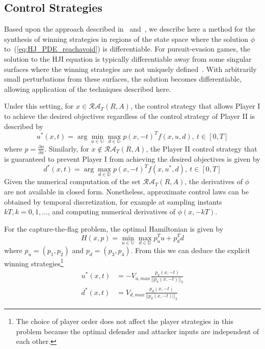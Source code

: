 \documentclass[letterpaper, 10 pt, conference]{ieeeconf}  %
\numberwithin{algorithm}{section}
\begin{document}
\subsection{Control Strategies}
\label{sub:ctrl_inputs}
Based upon the approach described in~\cite{j:Lygeros-automatica-1999} and~\cite{j:Tomlin-ProcIEEE-2000}, we describe here a method for the synthesis of winning strategies in regions of the state space where the solution $\phi$ to~(\ref{eq:HJ_PDE_reachavoid}) is differentiable.  For pursuit-evasion games, the solution to the HJI equation is typically differentiable away from some singular surfaces where the winning strategies are not uniquely defined~\cite{b:basar-olsder-1999}.  With arbitrarily small perturbations from these surfaces, the solution becomes differentiable, allowing application of the techniques described here.  

Under this setting, for $x \in \mathcal{RA}_T(R,A)$, the control strategy that allows Player I to achieve the desired objectives regardless of the control strategy of Player II is described by
\begin{equation}
	\label{eq:opt_ctrl_u}
  u^*(x,t)\! =\! \arg \min_{u \in \mathbb{U}} \max_{d \in \mathbb{D}} p(x,-t)^T f(x,u,d), \!\ t \in [0,T] 
\end{equation}
where $p = \frac{\partial \phi}{\partial x}$.  Similarly, for $x \notin \mathcal{RA}_T(R,A)$, the Player II control strategy that is guaranteed to prevent Player I from achieving the desired objectives is given by
\begin{equation}
	\label{eq:opt_ctrl_d}
  d^*(x,t) = \arg \max_{d \in \mathbb{D}} p(x,-t)^T f(x,u^*,d), \ t \in [0,T] 
\end{equation}
Given the numerical computation of the set $\mathcal{RA}_T(R,A)$, the derivatives of $\phi$ are not available in closed form.  Nonetheless, approximate control laws can be obtained by temporal discretization, for example at sampling instants $kT, k = 0,1,...$, and computing numerical derivatives of $\phi(x,-kT)$. 

For the capture-the-flag problem, the optimal Hamiltonian is given by
$$H\left(x,p\right) = \min_{u \in \mathbb{U}} \max_{d \in \mathbb{D}} p_u^T u + p_d^T d$$
where $p_u = (p_1, p_2)$ and $p_d = (p_3, p_4)$. From this we can deduce the explicit winning strategies\footnote {The choice of player order does not affect the player strategies in this problem because the optimal defender and attacker inputs are independent of each other.}
\begin{align}
	\label{eq:opt_ctf_u}
  u^*(x,t) &= -V_{a,max} \frac{p_u(x,-t)}{||p_u(x,-t)||_2} \\
	\label{eq:opt_ctf_d}
  d^*(x,t) &= V_{d,max} \frac{p_d(x,-t)}{||p_d(x,-t)||_2}
\end{align}
\end{document}
